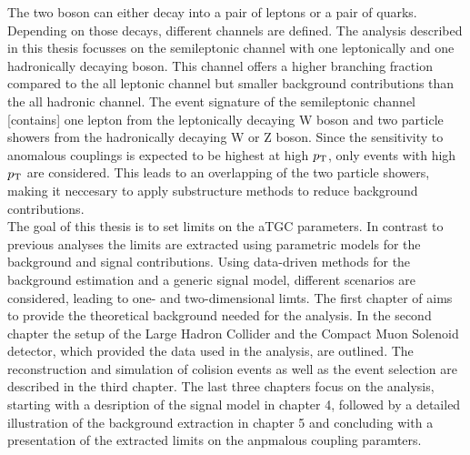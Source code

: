 The two boson can either decay into a pair of leptons or a pair of quarks. Depending on those decays, different channels are defined. The analysis described in this thesis focusses on the semileptonic channel with one leptonically and one hadronically decaying boson. This channel offers a higher branching fraction compared to the all leptonic channel but smaller background contributions than the all hadronic channel. The event signature of the semileptonic channel [contains] one lepton from the leptonically decaying W boson and two particle showers from the hadronically decaying W or Z boson. Since the sensitivity to anomalous couplings is expected to be highest at high $p_{\rm T}$, only events with high $p_{\rm T}$ are considered. This leads to an overlapping of the two particle showers, making it neccesary to apply substructure methods to reduce background contributions. \\

The goal of this thesis is to set limits on the aTGC parameters. In contrast to previous analyses the limits are extracted using parametric models for the background and signal contributions. Using data-driven methods for the background estimation and a generic signal model, different scenarios are considered, leading to one- and two-dimensional limts. The first chapter of aims to provide the theoretical background needed for the analysis. In the second chapter the setup of the Large Hadron Collider and the Compact Muon Solenoid detector, which provided the data used in the analysis, are outlined. The reconstruction and simulation of colision events as well as the event selection are described in the third chapter. The last three chapters focus on the analysis, starting with a desription of the signal model in chapter 4, followed by a detailed illustration of the background extraction in chapter 5 and concluding with a presentation of the extracted limits on the anpmalous coupling paramters.





